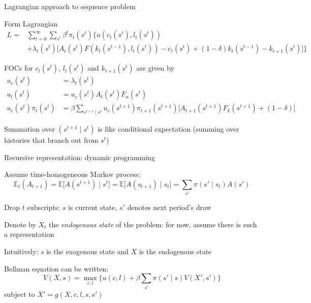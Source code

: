 \documentclass[11pt, aspectratio=169]{beamer}
\newenvironment{witemize}{\itemize\addtolength{\itemsep}{10pt}}{\enditemize}
\begin{document}
\begin{frame}{Lagrangian approach to sequence problem}
\begin{witemize}
\item Form Lagrangian 
\begin{align*}
	L = &\sum_{t=0}^\infty \sum_{s^t} \beta^t \pi_t(s^t) \bigg\{ u (c_t(s^t), l_t(s^t)) \\
	&+ \lambda_t(s^t) \bigg[ A_t(s^t) F(k_t(s^{t-1}), l_t(s^t)) - c_t(s^t) + (1-\delta) k_t(s^{t-1})  - k_{t+1}(s^t) \bigg] \bigg\}
\end{align*}

\item FOCs for $c_t(s^t)$, $l_t(s^t)$ and $k_{t+1}(s^t)$ are given by
\begin{align*}
	u_c(s^t) &= \lambda_t(s^t) \\
	u_l(s^t) &= u_c(s^t) A_t(s^t) F_n(s^t) \\
	u_c(s^t) \pi_t(s^t) &= \beta \sum_{s^{t+1} \mid s^t} u_c(s^{t+1}) \pi_{t+1}(s^{t+1}) \bigg[ A_{t+1} (s^{t+1}) F_k (s^{t+1}) + (1-\delta) \bigg]
\end{align*}

\item Summation over $(s^{t+1} \mid s^t)$ is like conditional expectation (summing over histories that branch out from $s^t$)
\end{witemize}
\end{frame}



\begin{frame}{Recursive representation: dynamic programming}
\begin{witemize}
\item Assume time-homogeneous Markov process:
\begin{equation*}
	\mathbb E_t (A_{t+1}) = \mathbb E \Big[ A(s^{t+1}) \mid s^t \Big] = \mathbb E \Big[ A(s_{t+1}) \mid s_t \Big] = \sum_{s'} \pi(s' \mid s_t) A(s')
\end{equation*}

\item Drop $t$ subscripts: $s$ is current state, $s'$ denotes next period's draw

\item Denote by $X_t$ the \textit{endogenous state} of the problem: for now, assume there is such a representation 

\item Intuitively: $s$ is the exogenous state and $X$ is the endogenous state 

\item Bellman equation can be written: 
\begin{equation*}
	V(X, s) = \max_{c, l} \bigg\{ u(c, l) + \beta \sum_{s'} \pi(s' \mid s) V(X', s') \bigg\}
\end{equation*}
subject to $X' = g(X, c, l, s, s')$
\end{witemize}
\end{frame}
\end{document}
